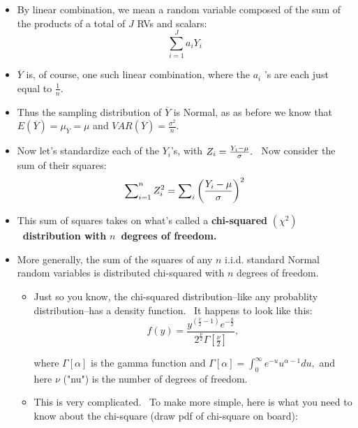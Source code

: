 \documentclass[11pt]{article}
\begin{document}
\begin{itemize}
\item By linear combination, we mean a random variable composed of the sum
of the products of a total of $J$ RVs and scalars:%
\begin{equation*}
\sum_{i=1}^{J}a_{i}Y_{i}
\end{equation*}

\item $\overline{Y}$ is, of course, one such linear combination, where the $%
a_{i}$ 's are each just equal to $\frac{1}{n}.$

\item Thus the sampling distribution of $\overline{Y}$ is Normal, as as
before we know that $E\left( \overline{Y}\right) =\mu _{\overline{Y}}=\mu $
and $VAR\left( \overline{Y}\right) =\frac{\sigma ^{2}}{n}.$

\item Now let's standardize each of the $Y_{i}$'s, with $Z_{i}=\frac{%
Y_{i}-\mu }{\sigma }.$ \ Now consider the sum of their squares:%
\begin{equation*}
\sum\nolimits_{i=1}^{n}Z_{i}^{2}=\sum\nolimits_{i}\left( \frac{Y_{i}-\mu }{%
\sigma }\right) ^{2}
\end{equation*}

\item This sum of squares takes on what's called a \textbf{chi-squared }$%
\left( \chi ^{2}\right) $\textbf{\ distribution with }$n$\textbf{\ degrees
of freedom.}

\item More generally, the sum of the squares of any $n$ i.i.d. standard
Normal random variables is distributed chi-squared with $n$ degrees of
freedom.

\begin{itemize}
\item Just so you know, the chi-squared distribution--like any probablity
distribution--has a density function. \ It happens to look like this:%
\begin{equation*}
f(y)=\frac{y^{\left( \frac{\nu }{2}-1\right) }e^{-\frac{y}{2}}}{2^{\frac{\nu 
}{2}}\Gamma \left[ \frac{\nu }{2}\right] },
\end{equation*}

where $\Gamma \left[ \alpha \right] $ is the gamma function and $\Gamma %
\left[ \alpha \right] =\int\nolimits_{0}^{\infty }e^{-u}u^{\alpha -1}du,$
and here $\nu $ ("nu") is the number of degrees of freedom.

\item This is very complicated. \ To make more simple, here is what you need
to know about the chi-square (draw pdf of chi-square on board):


\end{itemize}
\end{itemize}
\end{document}
